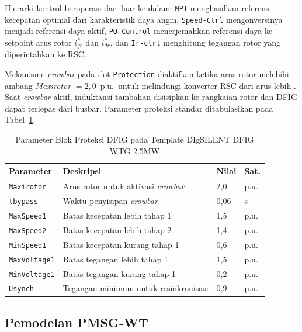 Hierarki kontrol beroperasi dari luar ke dalam: \texttt{MPT} menghasilkan referensi
kecepatan optimal dari karakteristik daya angin, \texttt{Speed-Ctrl} mengonversinya
menjadi referensi daya aktif, \texttt{PQ Control} menerjemahkan referensi daya ke
setpoint arus rotor $i_{qr}^*$ dan $i_{dr}^*$, dan \texttt{Ir-ctrl} menghitung
tegangan rotor yang diperintahkan ke RSC.

Mekanisme \textit{crowbar} pada slot \texttt{Protection} diaktifkan ketika arus rotor
melebihi ambang \textit{Maxirotor} $= 2{,}0$~p.u.\ untuk melindungi konverter RSC dari
arus lebih \cite{digsilent2024dfig}. Saat \textit{crowbar} aktif, induktansi tambahan
disisipkan ke rangkaian rotor dan DFIG dapat terlepas dari busbar. Parameter proteksi
standar ditabulasikan pada Tabel~\ref{tab:dfig-protection}.

\begin{table}[H]
\centering
\caption[Parameter Blok Proteksi DFIG pada Template DIgSILENT DFIG WTG 2.5MW]{Parameter Blok Proteksi DFIG pada Template DIgSILENT DFIG WTG 2.5MW
\cite{digsilent2024dfig}}
\label{tab:dfig-protection}
\small
\begin{tabular}{p{3.2cm} p{8.2cm} p{1.2cm} p{1.0cm}}
\toprule
\textbf{Parameter} & \textbf{Deskripsi} & \textbf{Nilai} & \textbf{Sat.} \\
\midrule
\texttt{Maxirotor}   & Arus rotor untuk aktivasi \textit{crowbar} & 2{,}0 & p.u. \\
\texttt{tbypass}     & Waktu penyisipan \textit{crowbar}           & 0{,}06 & s \\
\texttt{MaxSpeed1}   & Batas kecepatan lebih tahap 1               & 1{,}5 & p.u. \\
\texttt{MaxSpeed2}   & Batas kecepatan lebih tahap 2               & 1{,}4 & p.u. \\
\texttt{MinSpeed1}   & Batas kecepatan kurang tahap 1              & 0{,}6 & p.u. \\
\texttt{MaxVoltage1} & Batas tegangan lebih tahap 1                & 1{,}5 & p.u. \\
\texttt{MinVoltage1} & Batas tegangan kurang tahap 1               & 0{,}2 & p.u. \\
\texttt{Usynch}      & Tegangan minimum untuk resinkronisasi       & 0{,}9 & p.u. \\
\bottomrule
\end{tabular}
\end{table}

\subsection{Pemodelan PMSG-WT}

